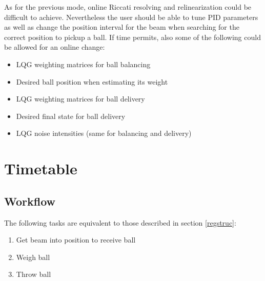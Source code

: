 \documentclass{article}
\begin{document}
As for the previous mode, online Riccati resolving and relinearization could be difficult to achieve. Nevertheless the user should be able to tune PID parameters as well as change the position interval for the beam when searching for the correct position to pickup a ball. If time permits, also some of the following could be allowed for an online change:
\begin{itemize}
\item LQG weighting matrices for ball balancing
\item Desired ball position when estimating its weight
\item LQG weighting matrices for ball delivery
\item Desired final state for ball delivery
\item LQG noise intensities (same for balancing and delivery)
\end{itemize}

\section{Timetable}
\subsection{Workflow}
The following tasks are equivalent to those described in section \ref{regstruc}:
\begin{enumerate}
	\item Get beam into position to receive ball
	\item Weigh ball
	\item Throw ball
\end{enumerate}
\end{document}
